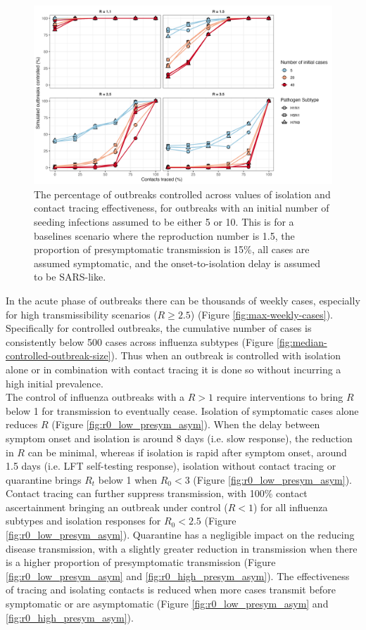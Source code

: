 \documentclass{article}
\begin{document}
\begin{figure}[ht]
\centering
\includegraphics[width=\textwidth]{../plots/prop_outbreak_control_num_init_cases.png}
\caption{The percentage of outbreaks controlled across values of isolation and contact tracing effectiveness, for outbreaks with an initial number of seeding infections assumed to be either 5 or 10. This is for a baselines scenario where the reproduction number is 1.5, the proportion of presymptomatic transmission is 15\%, all cases are assumed symptomatic, and the onset-to-isolation delay is assumed to be SARS-like.}
\label{fig:prop-outbreak-control-num-init-cases}
\end{figure}

In the acute phase of outbreaks there can be thousands of weekly cases, especially for high transmissibility scenarios ($R \geq 2.5$) (Figure \ref{fig:max-weekly-cases}). Specifically for controlled outbreaks, the cumulative number of cases is consistently below 500 cases across influenza subtypes (Figure \ref{fig:median-controlled-outbreak-size}). Thus when an outbreak is controlled with isolation alone or in combination with contact tracing it is done so without incurring a high initial prevalence. \\

The control of influenza outbreaks with a $R > 1$ require interventions to bring $R$ below 1 for transmission to eventually cease. Isolation of symptomatic cases alone reduces $R$ (Figure \ref{fig:r0_low_presym_asym}). When the delay between symptom onset and isolation is around 8 days (i.e. slow response), the reduction in $R$ can be minimal, whereas if isolation is rapid after symptom onset, around 1.5 days (i.e. LFT self-testing response), isolation without contact tracing or quarantine brings $R_t$ below 1 when $R_0 < 3$ (Figure \ref{fig:r0_low_presym_asym}). Contact tracing can further suppress transmission, with 100\% contact ascertainment bringing an outbreak under control ($R < 1$) for all influenza subtypes and isolation responses for $R_0 < 2.5$ (Figure \ref{fig:r0_low_presym_asym}). Quarantine has a negligible impact on the reducing disease transmission, with a slightly greater reduction in transmission when there is a higher proportion of presymptomatic transmission (Figure \ref{fig:r0_low_presym_asym} and \ref{fig:r0_high_presym_asym}). The effectiveness of tracing and isolating contacts is reduced when more cases transmit before symptomatic or are asymptomatic (Figure \ref{fig:r0_low_presym_asym} and \ref{fig:r0_high_presym_asym}).
\end{document}
